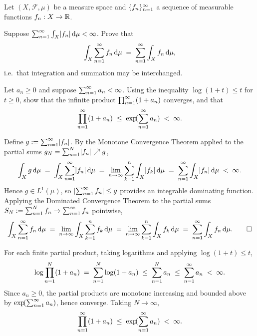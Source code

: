 \documentclass[10pt]{article}
\begin{document}
\MakeTitleBlock


\begin{problem}[1][Analysis]
Let $(X, \mathcal{F}, \mu)$ be a measure space and $\{f_n\}_{n=1}^{\infty}$ a sequence
of measurable functions $f_n : X \to \mathbb{R}$.

\begin{parts}
    \item Suppose $\sum_{n=1}^{\infty} \int_{X} \lvert f_n\rvert \,\mathrm{d}\mu < \infty$. Prove that
    \[
        \int_{X} \sum_{n=1}^{\infty} f_n \,\mathrm{d}\mu \;=\; \sum_{n=1}^{\infty} \int_{X} f_n \,\mathrm{d}\mu,
    \]
    i.e.\ that integration and summation may be interchanged.

    \item Let $a_n \ge 0$ and suppose $\sum_{n=1}^{\infty} a_n < \infty$. Using the inequality
    $\log(1 + t) \le t$ for $t \ge 0$, show that the infinite product
    $\prod_{n=1}^{\infty} (1 + a_n)$ converges, and that
    \[
        \prod_{n=1}^{\infty} (1 + a_n) \;\le\; \exp\!(\sum_{n=1}^{\infty} a_n) \;<\; \infty.
    \]
\end{parts}
\end{problem}

\begin{solution}
\begin{parts}
    \item Define $g := \sum_{n=1}^{\infty} \lvert f_n\rvert$. By the Monotone Convergence Theorem applied
    to the partial sums $g_N = \sum_{n=1}^{N} \lvert f_n\rvert \nearrow g$,
    \[
        \int_{X} g \,\mathrm{d}\mu \;=\; \int_{X} \sum_{n=1}^{\infty} \lvert f_n\rvert \,\mathrm{d}\mu
        \;=\; \lim_{n\to\infty} \sum_{k=1}^{n} \int_{X} \lvert f_k\rvert \,\mathrm{d}\mu
        \;=\; \sum_{n=1}^{\infty} \int_{X} \lvert f_n\rvert \,\mathrm{d}\mu \;<\; \infty.
    \]
    Hence $g \in L^1(\mu)$, so $\lvert\sum_{n=1}^{\infty} f_n\rvert \le g$ provides an integrable
    dominating function. Applying the Dominated Convergence Theorem to the partial sums
    $S_N := \sum_{n=1}^{N} f_n \to \sum_{n=1}^{\infty} f_n$ pointwise,
    \[
        \int_{X} \sum_{n=1}^{\infty} f_n \,\mathrm{d}\mu
        \;=\; \lim_{n\to\infty} \int_{X} \sum_{k=1}^{n} f_k \,\mathrm{d}\mu
        \;=\; \lim_{n\to\infty} \sum_{k=1}^{n} \int_{X} f_k \,\mathrm{d}\mu
        \;=\; \sum_{n=1}^{\infty} \int_{X} f_n \,\mathrm{d}\mu. \qed
    \]
    \bigskip 
    
    \item For each finite partial product, taking logarithms and applying $\log(1+t) \le t$,
    \[
        \log \prod_{n=1}^{N}(1 + a_n)
        \;=\; \sum_{n=1}^{N} \log(1 + a_n)
        \;\le\; \sum_{n=1}^{N} a_n
        \;\le\; \sum_{n=1}^{\infty} a_n \;<\; \infty.
    \]
    Since $a_n \ge 0$, the partial products are monotone increasing and bounded above by
    $\exp\!(\sum_{n=1}^{\infty} a_n)$, hence converge. Taking $N \to \infty$,
    \[
        \prod_{n=1}^{\infty} (1 + a_n) \;\le\; \exp\!(\sum_{n=1}^{\infty} a_n) \;<\; \infty. 
    \]
\end{parts}
\end{solution}
\end{document}
